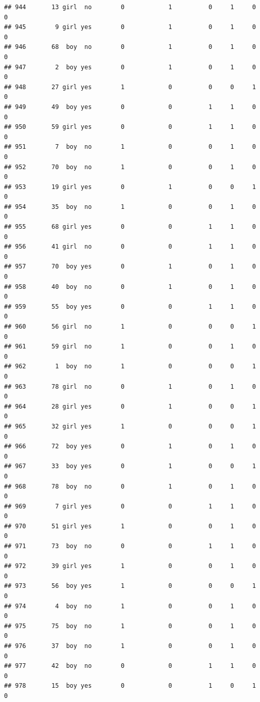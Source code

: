 \documentclass[man]{apa6}
\begin{document}
\begin{verbatim}
## 944       13 girl  no        0            1          0     1     0     0
## 945        9 girl yes        0            1          0     1     0     0
## 946       68  boy  no        0            1          0     1     0     0
## 947        2  boy yes        0            1          0     1     0     0
## 948       27 girl yes        1            0          0     0     1     0
## 949       49  boy yes        0            0          1     1     0     0
## 950       59 girl yes        0            0          1     1     0     0
## 951        7  boy  no        1            0          0     1     0     0
## 952       70  boy  no        1            0          0     1     0     0
## 953       19 girl yes        0            1          0     0     1     0
## 954       35  boy  no        1            0          0     1     0     0
## 955       68 girl yes        0            0          1     1     0     0
## 956       41 girl  no        0            0          1     1     0     0
## 957       70  boy yes        0            1          0     1     0     0
## 958       40  boy  no        0            1          0     1     0     0
## 959       55  boy yes        0            0          1     1     0     0
## 960       56 girl  no        1            0          0     0     1     0
## 961       59 girl  no        1            0          0     1     0     0
## 962        1  boy  no        1            0          0     0     1     0
## 963       78 girl  no        0            1          0     1     0     0
## 964       28 girl yes        0            1          0     0     1     0
## 965       32 girl yes        1            0          0     0     1     0
## 966       72  boy yes        0            1          0     1     0     0
## 967       33  boy yes        0            1          0     0     1     0
## 968       78  boy  no        0            1          0     1     0     0
## 969        7 girl yes        0            0          1     1     0     0
## 970       51 girl yes        1            0          0     1     0     0
## 971       73  boy  no        0            0          1     1     0     0
## 972       39 girl yes        1            0          0     1     0     0
## 973       56  boy yes        1            0          0     0     1     0
## 974        4  boy  no        1            0          0     1     0     0
## 975       75  boy  no        1            0          0     1     0     0
## 976       37  boy  no        1            0          0     1     0     0
## 977       42  boy  no        0            0          1     1     0     0
## 978       15  boy yes        0            0          1     0     1     0

\end{verbatim}
\end{document}
